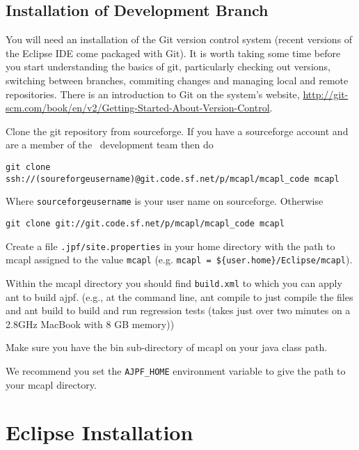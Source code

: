 \subsection{Installation of Development Branch}

You will need an installation of the Git version control system (recent versions of the Eclipse IDE come packaged with Git).  It is worth taking some time before you start understanding the basics of git, particularly checking out versions, switching between branches, commiting changes and managing local and remote repositories.  There is an introduction to Git on the system's website, \url{http://git-scm.com/book/en/v2/Getting-Started-About-Version-Control}.

\begin{itemize}
\begin{sloppypar}
\item Clone the git repository from sourceforge.  If you have a sourceforge account and are a member of the \ajpf\ development team then do
\begin{small}
\begin{verbatim}
git clone ssh://(soureforgeusername)@git.code.sf.net/p/mcapl/mcapl_code mcapl
\end{verbatim}
\end{small}
Where \texttt{sourceforgeusername} is your user name on sourceforge.  Otherwise
\begin{verbatim}
git clone git://git.code.sf.net/p/mcapl/mcapl_code mcapl
\end{verbatim}
\end{sloppypar}
\item Create a file \texttt{.jpf/site.properties} in your home directory with the path to mcapl assigned to the value \texttt{mcapl} (e.g. \texttt{mcapl = \$\{user.home\}/Eclipse/mcapl}).
\item Within the mcapl directory you should find \texttt{build.xml} to which you can apply ant to build ajpf. (e.g., at the command line, ant compile to just compile the files and ant build to build and run regression tests (takes just over two minutes on a 2.8GHz MacBook with 8 GB memory))
\item Make sure you have the bin sub-directory of mcapl on your java class path.
\item We recommend you set the \texttt{AJPF\_HOME} environment variable to give the path to your mcapl directory.
\end{itemize}

\section{Eclipse Installation}

